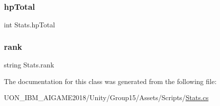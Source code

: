 \mbox{\label{class_stats_a75af420cf8465d711baf721ef1083a2c}} 
\subsubsection{\texorpdfstring{hpTotal}{hpTotal}}
{\footnotesize\ttfamily int Stats.\+hp\+Total}

\mbox{\label{class_stats_a674f883d2ae3a54728674ba9a88991a2}} 
\subsubsection{\texorpdfstring{rank}{rank}}
{\footnotesize\ttfamily string Stats.\+rank}



The documentation for this class was generated from the following file\+:\begin{DoxyCompactItemize}
\item 
U\+O\+N\+\_\+\+I\+B\+M\+\_\+\+A\+I\+G\+A\+M\+E2018/\+Unity/\+Group15/\+Assets/\+Scripts/\mbox{\hyperlink{_stats_8cs}{Stats.\+cs}}\end{DoxyCompactItemize}
